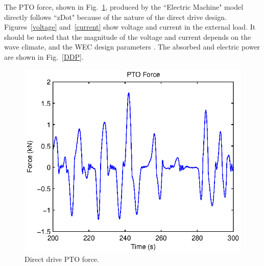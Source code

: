 \documentclass[twocolumn,10pt]{asme2e}
\begin{document}



The PTO force, shown in Fig.~\ref{DD_Fpto}, produced by the ``Electric Machine" model directly follows ``zDot" because of the nature of the direct drive design. Figures~\ref{voltage} and~\ref{current} show voltage and current in the external load. It should be noted that the magnitude of the voltage and current depends on the wave climate, and the WEC design parameters \cite{prudell2009novel}.  The absorbed and electric power are shown in Fig.~\ref{DDP}. 

\begin{figure}[t]
    \centering
    \includegraphics[width=1\columnwidth]{Images/DDFpto}
    \caption{Direct drive PTO force.}
    \label{DD_Fpto}
    \end{figure}
\end{document}

